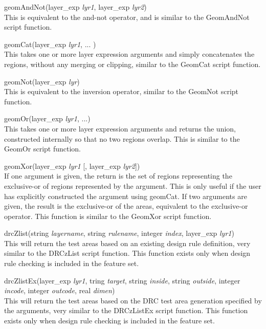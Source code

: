 \begin{description}
\item{\vt geomAndNot}(layer\_exp {\it lyr1\/}, layer\_exp {\it lyr2\/})\\
This is equivalent to the and-not operator, and is similar to the {\vt
GeomAndNot} script function.

\item{\vt geomCat}(layer\_exp {\it lyr1\/}, ... )\\
This takes one or more layer expression arguments and simply
concatenates the regions, without any merging or clipping, similar to
the {\vt GeomCat} script function.

\item{\vt geomNot}(layer\_exp {\it lyr\/})\\
This is equivalent to the inversion operator, similar to the {\vt
GeomNot} script function.

\item{\vt geomOr}(layer\_exp {\it lyr1\/}, ...)\\
This takes one or more layer expression arguments and returns the
union, constructed internally so that no two regions overlap.  This is
similar to the {\vt GeomOr} script function.

\item{\vt geomXor}(layer\_exp {\it lyr1} [, layer\_exp {\it lyr2\/}])\\
If one argument is given, the return is the set of regions
representing the exclusive-or of regions represented by the argument. 
This is only useful if the user has explicitly constructed the
argument using {\vt geomCat}.  If two arguments are given, the result
is the exclusive-or of the areas, equivalent to the exclusive-or
operator.  This function is similar to the {\vt GeomXor} script
function.

\item{\vt drcZlist}(string {\it layername\/}, string {\it rulename\/},
  integer {\it index\/}, layer\_exp {\it lyr1\/})\\
This will return the test areas based on an existing design rule
definition, very similar to the {\vt DRCzList} script function.  This
function exists only when design rule checking is included in the
feature set.

\item{\vt drcZlistEx}(layer\_exp {\it lyr1\/}, tring {\it target\/},
  string {\it inside\/}, string {\it outside\/}, integer {\it incode\/},
  integer {\it outcode\/}, real {\it dimen\/})\\
This will return the test areas based on the DRC test area generation
specified by the arguments, very similar to the {\vt DRCzListEx}
script function.  This function exists only when design rule checking
is included in the feature set.

\end{description}

